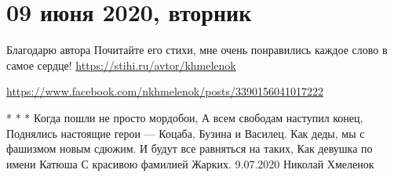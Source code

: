  
 
 
 
 
\section{09 июня 2020, вторник}
\label{sec:09_06_2020}

Благодарю автора 
Почитайте его стихи, мне очень понравились каждое слово в самое сердце!
\url{https://stihi.ru/avtor/khmelenok}

\url{https://www.facebook.com/nkhmelenok/posts/3390156041017222}

* * * 
Когда пошли не просто мордобои,
А всем свободам наступил конец,
Поднялись настоящие герои —
Коцаба, Бузина и Василец.
Как деды, мы с фашизмом новым сдюжим.
И будут все равняться на таких,
Как девушка по имени Катюша
С красивою фамилией Жарких.
9.07.2020
Николай Хмеленок
